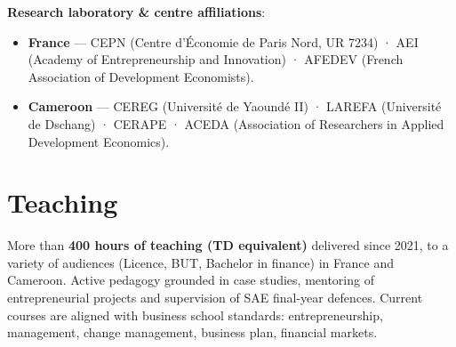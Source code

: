 \documentclass[
  french,
  10pt,
  letterpaper,
  DIV=11,
  numbers=noendperiod]{scrartcl}
\begin{document}
\textbf{Research laboratory \& centre affiliations}:

\begin{itemize}[itemsep=1pt]
\item \textbf{France} — CEPN (Centre d'Économie de Paris Nord, UR 7234) · AEI (Academy of Entrepreneurship and Innovation) · AFEDEV (French Association of Development Economists).
\item \textbf{Cameroon} — CEREG (Université de Yaoundé II) · LAREFA (Université de Dschang) · CERAPE · ACEDA (Association of Researchers in Applied Development Economics).
\end{itemize}

\section{Teaching}\label{teaching}

More than \textbf{400 hours of teaching (TD equivalent)} delivered since
2021, to a variety of audiences (Licence, BUT, Bachelor in finance) in
France and Cameroon. Active pedagogy grounded in case studies, mentoring
of entrepreneurial projects and supervision of SAE final-year defences.
Current courses are aligned with business school standards:
entrepreneurship, management, change management, business plan,
financial markets.

\vspace{2pt}
\end{document}

